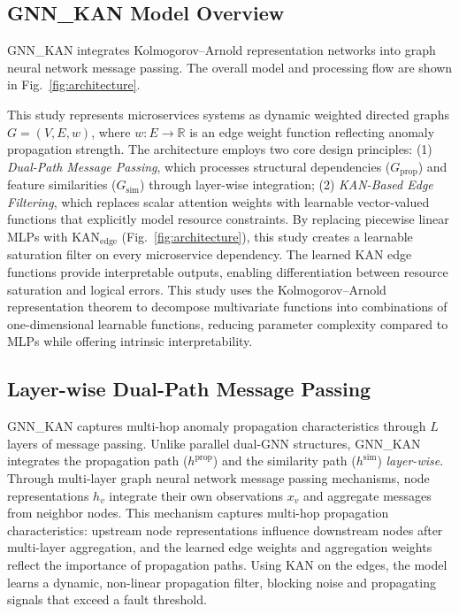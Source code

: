 \documentclass[conference]{IEEEtran}
\begin{document}
\subsection{GNN\_KAN Model Overview}

GNN\_KAN integrates Kolmogorov--Arnold representation networks into graph neural network message passing. The overall model and processing flow are shown in Fig.~\ref{fig:architecture}.

This study represents microservices systems as dynamic weighted directed graphs $G = (V, E, w)$, where $w: E \to \mathbb{R}$ is an edge weight function reflecting anomaly propagation strength. The architecture employs two core design principles: (1) \textit{Dual-Path Message Passing}, which processes structural dependencies ($G_{\text{prop}}$) and feature similarities ($G_{\text{sim}}$) through layer-wise integration; (2) \textit{KAN-Based Edge Filtering}, which replaces scalar attention weights with learnable vector-valued functions that explicitly model resource constraints. By replacing piecewise linear MLPs with $\text{KAN}_{\text{edge}}$ (Fig.~\ref{fig:architecture}), this study creates a learnable saturation filter on every microservice dependency. The learned KAN edge functions provide interpretable outputs, enabling differentiation between resource saturation and logical errors. This study uses the Kolmogorov--Arnold representation theorem \cite{kolmogorov1957,kan2024} to decompose multivariate functions into combinations of one-dimensional learnable functions, reducing parameter complexity compared to MLPs while offering intrinsic interpretability.

\subsection{Layer-wise Dual-Path Message Passing}

GNN\_KAN captures multi-hop anomaly propagation characteristics through $L$ layers of message passing. Unlike parallel dual-GNN structures, GNN\_KAN integrates the propagation path ($h^{\text{prop}}$) and the similarity path ($h^{\text{sim}}$) \textit{layer-wise}. Through multi-layer graph neural network message passing mechanisms, node representations $h_v$ integrate their own observations $x_v$ and aggregate messages from neighbor nodes. This mechanism captures multi-hop propagation characteristics: upstream node representations influence downstream nodes after multi-layer aggregation, and the learned edge weights and aggregation weights reflect the importance of propagation paths. Using KAN on the edges, the model learns a dynamic, non-linear propagation filter, blocking noise and propagating signals that exceed a fault threshold.
\end{document}
